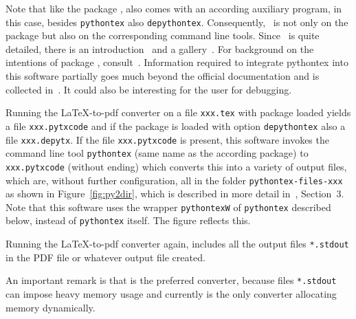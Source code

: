 Note that like the package , also  
comes with an according auxiliary program, 
in this case, besides \texttt{pythontex} also \texttt{depythontex}. 
Consequently,~\cite{PythonTexP} is not only on the package 
but also on the corresponding command line tools. 
Since~\cite{PythonTexP} is quite detailed, 
there is an introduction~\cite{PythonTexQ} and a gallery~\cite{PythonTexG}. 
For background on the intentions of package , consult~\cite{PythonTexRepr}. 
Information required to integrate pythontex into this software 
partially goes much beyond the official documentation and is collected in~\cite{PyTexInOut}. 
It could also be interesting for the user for debugging. 

Running the \LaTeX-to-pdf converter on a file \texttt{xxx.tex} 
with package  loaded 
yields a file \texttt{xxx.pytxcode} 
and if the package is loaded with option \texttt{depythontex} 
also a file \texttt{xxx.depytx}.
If the file \texttt{xxx.pytxcode} is present, 
this software invokes the command line tool \texttt{pythontex} 
(same name as the according package) 
to \texttt{xxx.pytxcode} (without ending) 
which converts this into a variety of output files, 
which are, without further configuration, 
all in the folder \texttt{pythontex-files-xxx}
as shown in Figure~\ref{fig:py2dir}, 
which is described in more detail in~\cite{PyTexInOut}, Section~3. 
Note that this software uses the wrapper \texttt{pythontexW} 
of \texttt{pythontex} described below, instead of \texttt{pythontex} itself. 
The figure reflects this. 


Running the \LaTeX-to-pdf converter again, 
includes all the output files \texttt{*.stdout} 
in the PDF file or whatever output file created. 


An important remark is that \lualatex{} is the preferred converter, 
because files \texttt{*.stdout} can impose heavy memory usage 
and currently \lualatex{} is the only converter allocating memory dynamically. 

